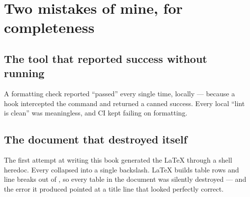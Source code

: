 \section{Two mistakes of mine, for completeness}

\subsection{The tool that reported success without running}

A formatting check reported ``passed'' every single time, locally --- because a
hook intercepted the command and returned a canned success. Every local ``lint
is clean'' was meaningless, and CI kept failing on formatting.


\subsection{The document that destroyed itself}

The first attempt at writing this book generated the LaTeX through a shell
heredoc. Every \fpath{\textbackslash\textbackslash} collapsed into a single
backslash. LaTeX builds table rows and line breaks out of
\fpath{\textbackslash\textbackslash}, so every table in the document was
silently destroyed --- and the error it produced pointed at a title line that
looked perfectly correct.

